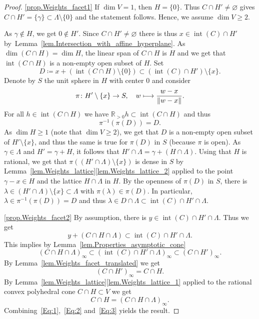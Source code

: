 \documentclass[JEP,XML,SOM,Unicode]{cedram}
\def\mto{\mathchoice{\longmapsto}{\mapsto}{\mapsto}{\mapsto}}
\theoremstyle{plain}
\theoremstyle{definition}
\DeclareMathOperator{\inter}{int}
\newcommand{\norm}[1]{\left\lVert#1\right\rVert}
\newcommand{\RR}{\mathbb{R}}
\begin{document}
\skpt
\begin{proof}
\eqref{prop.Weights_facet1}
If $\dim V = 1$, then $H = \{0\}$. Thus
$C \cap H' \neq \varnothing$ gives $C \cap H' = \{\gamma\} \subset \Lambda \setminus \{0\}$ and
the statement follows. Hence, we assume $\dim V \geq 2$.

As $\gamma \not\in H$, we get $0 \not\in H'$.
Since $C \cap H' \neq \varnothing$ there is thus $x \in \inter(C) \cap H'$
by~Lemma~\ref{lem.Intersection_with_affine_hyperplane}.
As $\dim(C \cap H) = \dim H$, the linear
span of $C \cap H$ is $H$ and we get that
$\inter(C \cap H)$ is a non-empty open subset of $H$. Set
\[
D \coloneqq x + (\inter(C\cap H) \setminus \{0\}) \subset (\inter(C) \cap H') \setminus \{x\}.
\]
Denote by $S$ the unit sphere in $H$ with center $0$ and consider
\[
\pi \colon H' \setminus \{x\} \to S, \quad w \mto \frac{w-x}{\norm{w-x}}.
\]
For all $h \in \inter(C \cap H)$ we have $\RR_{> 0}h \subset \inter(C \cap H)$ and thus
\[
\pi^{-1}(\pi(D)) = D.
\]
As $\dim H \geq 1$ (note that $\dim V \geq 2$), we get that $D$ is a non-empty open subset of $H' \setminus \{x\}$, and thus
the same is true
for $\pi(D)$ in $S$ (because $\pi$ is open). As
$\gamma \in \Lambda$ and $H' = \gamma + H$, it follows that
$H' \cap \Lambda = \gamma + (H \cap \Lambda)$. Using that $H$ is rational,
we get that
$\pi((H' \cap \Lambda) \setminus \{x\})$ is dense in $S$ by Lemma~\ref{lem.Weights_lattice}\eqref{lem.Weights_lattice_2} applied to the point $\gamma - x \in H$
and the lattice $H \cap \Lambda$ in $H$.
By the openness of $\pi(D)$ in $S$,
there is $\lambda \in (H' \cap \Lambda) \setminus \{x\} \subset \Lambda$
with $\pi(\lambda) \in \pi(D)$.
In particular, $\lambda \in \pi^{-1}(\pi(D)) = D$ and thus
$\lambda \in D \cap \Lambda \subset \inter(C) \cap H' \cap \Lambda$.

\eqref{prop.Weights_facet2} By assumption, there is $y \in \inter(C) \cap H' \cap \Lambda$. Thus
we get
\[
y + (C \cap H \cap \Lambda) \subset \inter(C) \cap H' \cap \Lambda.
\]
This implies by Lemma~\ref{lem.Properties_asymptotic_cone}
\[
\label{Eq:1}
\tag{a}
(C \cap H \cap \Lambda)_{\infty} \subset (\inter(C) \cap H' \cap \Lambda)_{\infty}
\subset (C \cap H')_{\infty}.
\]
By Lemma~\ref{lem.Weights_facet_translated} we get
\[
\label{Eq:2}
\tag{b}
(C \cap H')_{\infty} = C \cap H.
\]
By Lemma~\ref{lem.Weights_lattice}\eqref{lem.Weights_lattice_1}
applied to the rational convex polyhedral cone
$C \cap H \subset V$ we get
\[
\label{Eq:3}
\tag{c}
C \cap H = (C \cap H \cap \Lambda)_{\infty}.
\]
Combining~\eqref{Eq:1},~\eqref{Eq:2} and~\eqref{Eq:3} yields the result.
\end{proof}
\end{document}
